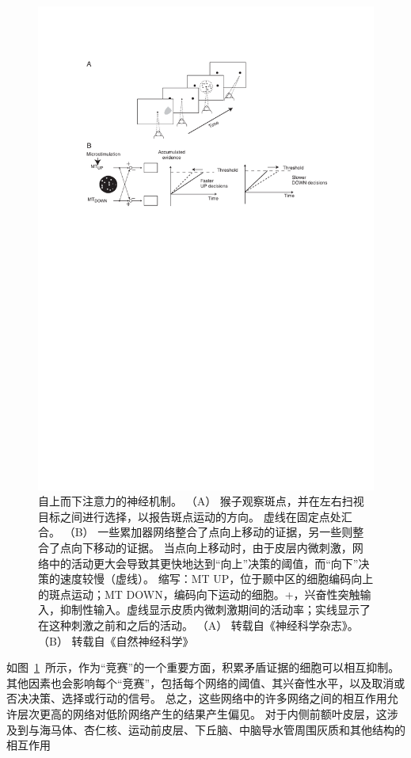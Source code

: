 \begin{figure}[!htb]
	\centering
	\includegraphics{chap3/3_5}
	\caption{自上而下注意力的神经机制。
		（A） 猴子观察斑点，并在左右扫视目标之间进行选择，以报告斑点运动的方向。
		虚线在固定点处汇合。
		（B） 一些累加器网络整合了点向上移动的证据，另一些则整合了点向下移动的证据。
		当点向上移动时，由于皮层内微刺激，网络中的活动更大会导致其更快地达到“向上”决策的阈值，而“向下”决策的速度较慢（虚线）。
		缩写：MT UP，位于颞中区的细胞编码向上的斑点运动；MT DOWN，编码向下运动的细胞。+，兴奋性突触输入，抑制性输入。虚线显示皮质内微刺激期间的活动率；实线显示了在这种刺激之前和之后的活动。
		（A） 转载自《神经科学杂志》\cite{roitman2002response}。
		（B） 转载自《自然神经科学》\cite{ditterich2003microstimulation}}
	\label{fig:3_5}
\end{figure}


如图~\ref{fig:3_5}~所示，作为“竞赛”的一个重要方面，积累矛盾证据的细胞可以相互抑制。
其他因素也会影响每个“竞赛”，包括每个网络的阈值、其兴奋性水平，以及取消或否决决策、选择或行动的信号。
总之，这些网络中的许多网络之间的相互作用允许层次更高的网络对低阶网络产生的结果产生偏见。
对于内侧前额叶皮层，这涉及到与海马体、杏仁核、运动前皮层、下丘脑、中脑导水管周围灰质和其他结构的相互作用\par


